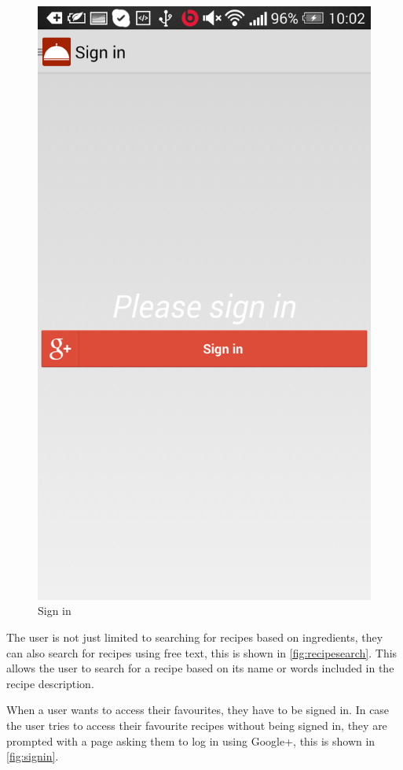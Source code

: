 \begin{figure}[H]
\begin{minipage}[t]{0.5\columnwidth}
\includegraphics[width=0.7\columnwidth]{img/screenshots/finalsignin.png}
\caption{Sign in\label{fig:signin}}
\end{minipage}
\end{figure}

The user is not just limited to searching for recipes based on ingredients, they can also search for recipes using free text, this is shown in \autoref{fig:recipesearch}. This allows the user to search for a recipe based on its name or words included in the recipe description.

When a user wants to access their favourites, they have to be signed in. In case the user tries to access their favourite recipes without being signed in, they are prompted with a page asking them to log in using Google+, this is shown in \autoref{fig:signin}.

